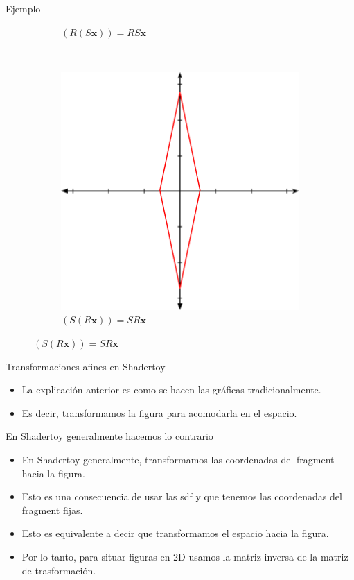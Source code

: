\begin{frame}{Ejemplo}
\begin{figure}[htp]
\begin{subfigure}[b]{0.25\textwidth}
   \caption{$( R ( S \mathbf{x})) = R S \mathbf{x}$}
 \end{subfigure}
 ~
 \begin{subfigure}[b]{0.25\textwidth}
   \includegraphics[width=\textwidth]{img/RoateScale}
   \caption{$(S (R \mathbf{x})) = S R \mathbf{x}$}
 \end{subfigure}
\end{figure}
\end{frame}

\begin{frame}{Transformaciones afines en Shadertoy}
\begin{itemize}
    \item La explicación anterior es como se hacen las gráficas tradicionalmente.
    \item Es decir, transformamos la figura para acomodarla en el espacio.
\end{itemize}
\begin{alertblock}{En Shadertoy generalmente hacemos lo contrario}
    \begin{itemize}
        \item En Shadertoy generalmente, transformamos las coordenadas del fragment hacia la figura.
        \item Esto es una consecuencia de usar las sdf y que tenemos las coordenadas del fragment fijas.
        \item Esto es equivalente a decir que transformamos el espacio hacia la figura.
        \item Por lo tanto, para situar figuras en 2D usamos la matriz inversa de la matriz de trasformación.
    \end{itemize}
\end{alertblock}
\end{frame}

